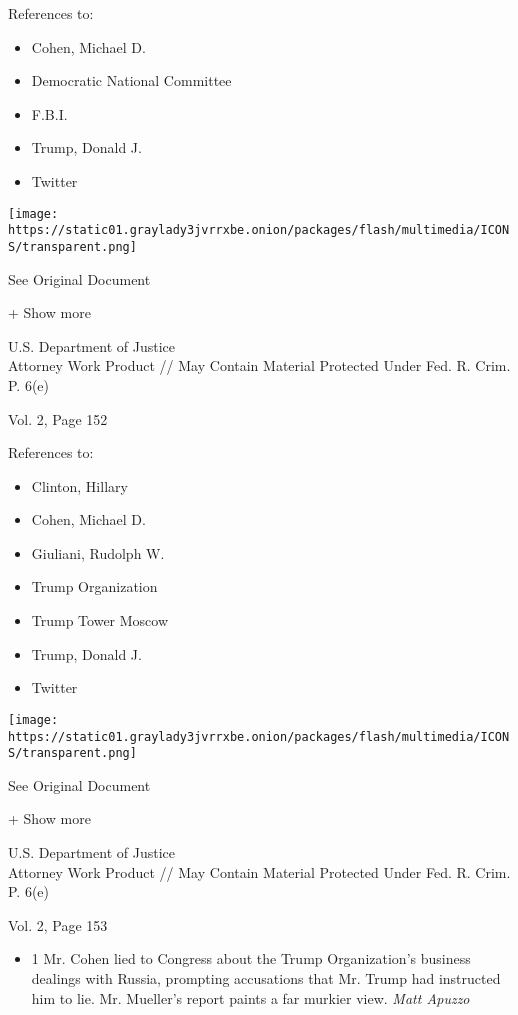 References to:

\begin{itemize}
\tightlist
\item
  Cohen, Michael D.
\item
  Democratic National Committee
\item
  F.B.I.
\item
  Trump, Donald J.
\item
  Twitter
\end{itemize}

\protect\hyperlink{}{}

\texttt{[image: https://static01.graylady3jvrrxbe.onion/packages/flash/multimedia/ICONS/transparent.png]}

See Original Document

+ Show more

U.S. Department of Justice\\
Attorney Work Product // May Contain Material Protected Under Fed. R.
Crim. P. 6(e)

Vol. 2, Page 152

References to:

\begin{itemize}
\tightlist
\item
  Clinton, Hillary
\item
  Cohen, Michael D.
\item
  Giuliani, Rudolph W.
\item
  Trump Organization
\item
  Trump Tower Moscow
\item
  Trump, Donald J.
\item
  Twitter
\end{itemize}

\protect\hyperlink{}{}

\texttt{[image: https://static01.graylady3jvrrxbe.onion/packages/flash/multimedia/ICONS/transparent.png]}

See Original Document

+ Show more

U.S. Department of Justice\\
Attorney Work Product // May Contain Material Protected Under Fed. R.
Crim. P. 6(e)

Vol. 2, Page 153

\begin{itemize}
\tightlist
\item
  1 Mr. Cohen lied to Congress about the Trump Organization's business
  dealings with Russia, prompting accusations that Mr. Trump had
  instructed him to lie. Mr. Mueller's report paints a far murkier view.
  \emph{Matt Apuzzo}
\end{itemize}

